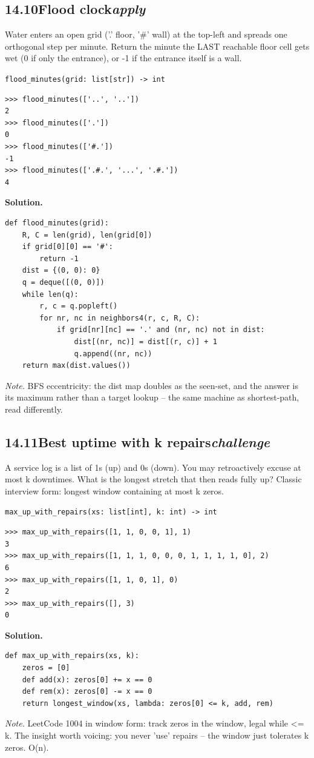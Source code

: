 \documentclass[10pt,letterpaper]{book}
\begin{document}
\subsection*{14.10\quad Flood clock\hfill\textnormal{\textit{apply}}}
Water enters an open grid ('.' floor, '\#' wall) at the top-left and spreads one orthogonal step per minute. Return the minute the LAST reachable floor cell gets wet (0 if only the entrance), or -1 if the entrance itself is a wall.

\noindent\texttt{flood\_minutes(grid: list[str]) -> int}
\begin{lstlisting}[style=ex]
>>> flood_minutes(['..', '..'])
2
>>> flood_minutes(['.'])
0
>>> flood_minutes(['#.'])
-1
>>> flood_minutes(['.#.', '...', '.#.'])
4
\end{lstlisting}
\noindent\textbf{Solution.}
\begin{lstlisting}[style=code]
def flood_minutes(grid):
    R, C = len(grid), len(grid[0])
    if grid[0][0] == '#':
        return -1
    dist = {(0, 0): 0}
    q = deque([(0, 0)])
    while len(q):
        r, c = q.popleft()
        for nr, nc in neighbors4(r, c, R, C):
            if grid[nr][nc] == '.' and (nr, nc) not in dist:
                dist[(nr, nc)] = dist[(r, c)] + 1
                q.append((nr, nc))
    return max(dist.values())
\end{lstlisting}
\noindent\textit{Note.} BFS eccentricity: the dist map doubles as the seen-set, and the answer is its maximum rather than a target lookup -- the same machine as shortest-path, read differently.

\subsection*{14.11\quad Best uptime with k repairs\hfill\textnormal{\textit{challenge}}}
A service log is a list of 1s (up) and 0s (down). You may retroactively excuse at most k downtimes. What is the longest stretch that then reads fully up? Classic interview form: longest window containing at most k zeros.

\noindent\texttt{max\_up\_with\_repairs(xs: list[int], k: int) -> int}
\begin{lstlisting}[style=ex]
>>> max_up_with_repairs([1, 1, 0, 0, 1], 1)
3
>>> max_up_with_repairs([1, 1, 1, 0, 0, 0, 1, 1, 1, 1, 0], 2)
6
>>> max_up_with_repairs([1, 1, 0, 1], 0)
2
>>> max_up_with_repairs([], 3)
0
\end{lstlisting}
\noindent\textbf{Solution.}
\begin{lstlisting}[style=code]
def max_up_with_repairs(xs, k):
    zeros = [0]
    def add(x): zeros[0] += x == 0
    def rem(x): zeros[0] -= x == 0
    return longest_window(xs, lambda: zeros[0] <= k, add, rem)
\end{lstlisting}
\noindent\textit{Note.} LeetCode 1004 in window form: track zeros in the window, legal while <= k. The insight worth voicing: you never 'use' repairs -- the window just tolerates k zeros. O(n).
\end{document}
